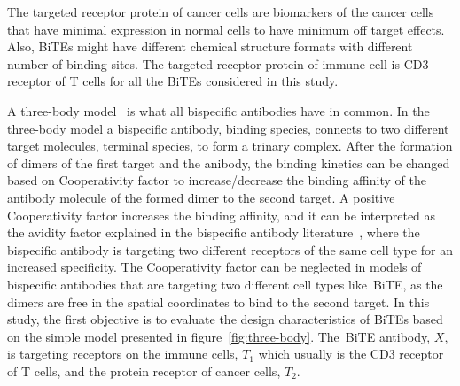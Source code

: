 The targeted receptor protein of cancer cells are biomarkers of the cancer cells that have minimal expression in normal cells to have minimum off target effects. Also, \ac{BiTE}s might have different chemical structure formats with different number of binding sites. The targeted receptor protein of immune cell is CD3 receptor of T cells for all the \ac{BiTE}s considered in this study.

A three-body model~\cite{douglass2013comprehensive} is what all bispecific antibodies have in common. In the three-body model a bispecific antibody, binding species, connects to two different target molecules, terminal species, to form a trinary complex. After the formation of dimers of the first target and the anibody, the binding kinetics can be changed based on Cooperativity factor to increase/decrease the binding affinity of the antibody molecule of the formed dimer to the second target. A positive Cooperativity factor increases the binding affinity, and it can be interpreted as the avidity factor explained in the bispecific antibody literature~\cite{rhoden2016modeling, sengers2016modeling, harms2014understanding, kaufman1992effect}, where the bispecific antibody is targeting two different receptors of the same cell type for an increased specificity. The Cooperativity factor can be neglected in models of bispecific antibodies that are targeting two different cell types like~\ac{BiTE}, as the dimers are free in the spatial coordinates to bind to the second target. In this study, the first objective is to evaluate the design characteristics of \ac{BiTE}s based on the simple model presented in figure~\ref{fig:three-body}. The~\ac{BiTE} antibody, $X$, is targeting receptors on the immune cells, $T_1$ which usually is the CD3 receptor of T cells, and the protein receptor of cancer cells, $T_2$.  

